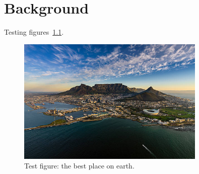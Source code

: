 \chapter{Background}

Testing figures~\ref{fig:Test-image}. 

\begin{figure}[hbt]
\centering
\includegraphics[width=0.8\textwidth]{Chapters/chapter-2/figures/example.jpg}
\caption{Test figure: the best place on earth.}
\label{fig:Test-image}
\end{figure}
